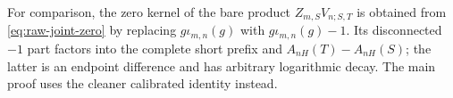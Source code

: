 \begin{remark}
\label{rem:centered-zero-kernel}
For comparison, the zero kernel of the bare product
\(Z_{m,S}V_{n;S,T}\) is obtained from
\eqref{eq:raw-joint-zero} by replacing
\(g\iota_{m,n}(g)\) with \(g\iota_{m,n}(g)-1\).  Its disconnected
\(-1\) part factors into the complete short prefix and
\(A_{nH}(T)-A_{nH}(S)\); the latter is an endpoint difference and has
arbitrary logarithmic decay.  The main proof uses the cleaner
calibrated identity instead.
\end{remark}
